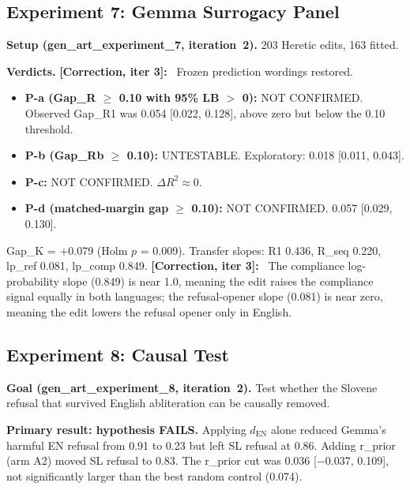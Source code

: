 \documentclass[11pt,letterpaper]{article}
\newcommand{\corr}[1]{\noindent\textbf{[Correction, iter #1]:}~}
\begin{document}
\subsection{Experiment 7: Gemma Surrogacy Panel}\label{sec:exp7}

\textbf{Setup (gen\_art\_experiment\_7, iteration~2).} 203 Heretic edits, 163 fitted.

\textbf{Verdicts.} \corr{3} Frozen prediction wordings restored.
\begin{itemize}
\item \textbf{P-a (Gap\_R $\geq$ 0.10 with 95\% LB $>$ 0):} NOT CONFIRMED. Observed Gap\_R1 was 0.054 [0.022, 0.128], above zero but below the 0.10 threshold.
\item \textbf{P-b (Gap\_Rb $\geq$ 0.10):} UNTESTABLE. Exploratory: 0.018 [0.011, 0.043].
\item \textbf{P-c:} NOT CONFIRMED. $\Delta R^2 \approx 0$.
\item \textbf{P-d (matched-margin gap $\geq$ 0.10):} NOT CONFIRMED. 0.057 [0.029, 0.130].
\end{itemize}

Gap\_K = +0.079 (Holm $p$ = 0.009). Transfer slopes: R1 0.436, R\_seq 0.220, lp\_ref 0.081, lp\_comp 0.849. \corr{3} The compliance log-probability slope (0.849) is near 1.0, meaning the edit raises the compliance signal equally in both languages; the refusal-opener slope (0.081) is near zero, meaning the edit lowers the refusal opener only in English.


\subsection{Experiment 8: Causal Test}\label{sec:exp8}

\textbf{Goal (gen\_art\_experiment\_8, iteration~2).} Test whether the Slovene refusal that survived English abliteration can be causally removed.

\textbf{Primary result: hypothesis FAILS.} Applying $d_\mathrm{EN}$ alone reduced Gemma's harmful EN refusal from 0.91 to 0.23 but left SL refusal at 0.86. Adding r\_prior (arm A2) moved SL refusal to 0.83. The r\_prior cut was 0.036 [$-$0.037, 0.109], not significantly larger than the best random control (0.074).
\end{document}
